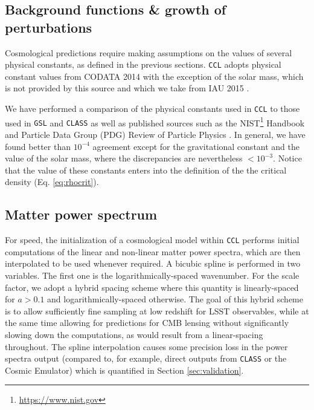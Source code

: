 \documentclass[\docopts]{\docclass}
\newcommand{\ccl}{{\tt CCL}\xspace}
\newcommand{\class}{{\tt CLASS}\xspace}
\begin{document}
\subsection{Background functions \& growth of perturbations}
\label{sec:distances}

Cosmological predictions require making assumptions on the values of several physical constants, as defined in the previous sections. \ccl adopts physical constant values from CODATA 2014 \citep{CODATA14} with the exception of the solar mass, which is not provided by this source and which we take from IAU 2015 \citep{IAU15}.

We have performed a comparison of the physical constants used in \ccl to those used in {\tt GSL} and \class as well as published sources such as the NIST\footnote{\url{https://www.nist.gov}} Handbook and Particle Data Group (PDG) Review of Particle Physics \citep{Beringer:1900zz}. In general, we have found better than $10^{-4}$ agreement except for the gravitational constant and the value of the solar mass, where the discrepancies are nevertheless $<10^{-3}$. Notice that the value of these constants enters into the definition of the the critical density (Eq. \ref{eq:rhocrit}). 


\subsection{Matter power spectrum}\label{ssec:mpspec}

For speed, the initialization of a cosmological model within \ccl performs initial computations of the linear and non-linear matter power spectra, which are then interpolated to be used whenever required. A bicubic spline is performed in two variables. The first one is the logarithmically-spaced wavenumber. For the scale factor, we adopt a hybrid spacing scheme where this quantity is linearly-spaced for $a>0.1$ and logarithmically-spaced otherwise. The goal of this hybrid scheme is to allow sufficiently fine sampling at low redshift for LSST observables, while at the same time allowing for predictions for CMB lensing without significantly slowing down the computations, as would result from a linear-spacing throughout. The spline interpolation causes some precision loss in the power spectra output (compared to, for example, direct outputs from \class or the Cosmic Emulator) which is quantified in Section \ref{sec:validation}.
\end{document}
